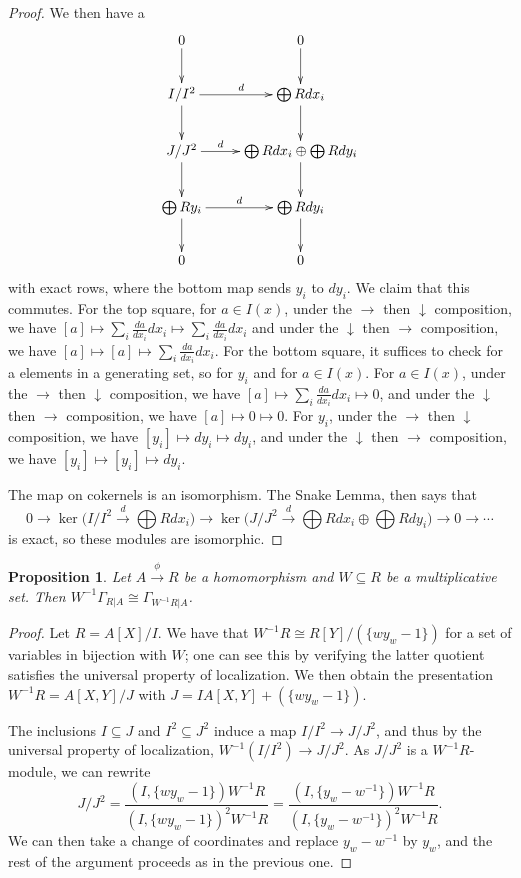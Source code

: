 \documentclass{amsart}[12pt]
\def\ker{\operatorname{ker}}
\numberwithin{equation}{section}
\theoremstyle{plain} %
\newtheorem{prop}[equation]{Proposition}
\theoremstyle{definition}
\theoremstyle{remark}
\newcommand{\xra}[1]{\xrightarrow{#1}}
\begin{document}
\begin{proof}
We then have a
\[ \xymatrix{
0 \ar[d] & 0 \ar[d] \\
I/I^2 \ar[r]^{d} \ar[d] & \bigoplus R dx_i \ar[d]\\
J/J^2 \ar[r]^-d \ar[d]& \bigoplus R dx_i \oplus \bigoplus R dy_i \ar[d]\\
\bigoplus R y_i  \ar[r]^-d\ar[d] & \bigoplus R dy_i \ar[d] \\ 
0 & 0
 }\]
 with exact rows, where the bottom map sends $y_i$ to $dy_i$. We claim that this commutes. For the top square, for $a\in I(x)$, under the $\rightarrow$ then $\downarrow$ composition, we have $[a] \mapsto \sum_i \frac{da}{dx_i}dx_i \mapsto \sum_i \frac{da}{dx_i}dx_i$ and under the $\downarrow$ then $\rightarrow$ composition, we have $[a] \mapsto [a] \mapsto \sum_i \frac{da}{dx_i}dx_i$. For the bottom square, it suffices to check for a elements in a generating set, so for $y_i$ and for $a\in I(x)$. For $a\in I(x)$,  under the $\rightarrow$ then $\downarrow$ composition, we have $[a] \mapsto \sum_i \frac{da}{dx_i}dx_i \mapsto 0$, and under the $\downarrow$ then $\rightarrow$ composition, we have $[a] \mapsto 0 \mapsto 0$. For $y_i$,  under the $\rightarrow$ then $\downarrow$ composition, we have $[y_i] \mapsto dy_i \mapsto dy_i$, and under the $\downarrow$ then $\rightarrow$ composition, we have $[y_i] \mapsto [y_i] \mapsto dy_i$. 
 
The map on cokernels is an isomorphism. The Snake Lemma, then says that 
\[ 0 \to  \ker\big( I/I^2 \xra{d} \bigoplus R dx_i \big) \to \ker\big( J/J^2 \xra{d} \bigoplus R dx_i \oplus \bigoplus R dy_i \big) \to 0 \to \cdots\]
is exact, so these modules are isomorphic.
\end{proof}


\begin{prop} Let $A\xra{\phi} R$ be a homomorphism and $W\subseteq R$ be a multiplicative set. Then $W^{-1}\Gamma_{R|A} \cong \Gamma_{W^{-1}R|A}$.
\end{prop}
\begin{proof} Let $R=A[X]/I$. We have that $W^{-1}R \cong R[Y]/(\{w y_w - 1\})$ for a set of variables in bijection with $W$; one can see this by verifying the latter quotient satisfies the universal property of localization. We then obtain the presentation $W^{-1}R= A[X,Y]/J$ with $J= IA[X,Y] + (\{w y_w - 1\})$. 

The inclusions $I\subseteq J$ and $I^2\subseteq J^2$ induce a map $I/I^2 \to J/J^2$, and thus by the universal property of localization,  $W^{-1}(I/I^2)\to J/J^2$. As $J/J^2$ is a $W^{-1}R$-module, we can rewrite \[ J/J^2=\frac{(I,\{ w y_w-1\})W^{-1}R}{ (I,\{ w y_w-1\})^2 W^{-1}R} = \frac{(I,\{ y_w - w^{-1}\})W^{-1}R}{ (I,\{ y_w - w^{-1}\})^2 W^{-1}R}.\]
We can then take a change of coordinates and replace $y_w-w^{-1}$ by $y_w$, and the rest of the argument proceeds as in the previous one.
\end{proof}
\end{document}
